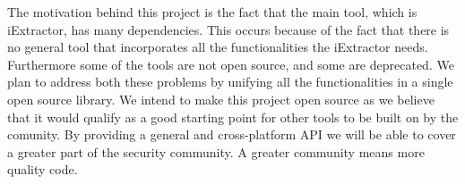 
The motivation behind this project is the fact that the main tool, which is
iExtractor, has many dependencies. This occurs because of the fact that there
is no general tool that incorporates all the functionalities the iExtractor
needs. Furthermore some of the tools are not open source, and some are
deprecated. We plan to address both these problems by unifying all the
functionalities in a single open source library.
We intend to make this project open source as we believe that it would qualify
as a good starting point for other tools to be built on by the comunity.
By providing a general and cross-platform API we will be able to cover a
greater part of the security community. A greater community means more
quality code.

